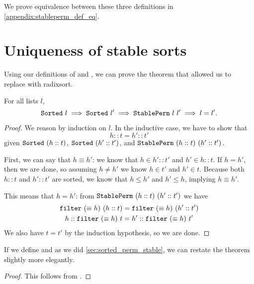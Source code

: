 \documentclass[sigplan,10pt,anonymous,review]{thesis}
\begin{document}
We prove equivalence between these three definitions in
\cref{appendix:stableperm_def_eq}.

\section{Uniqueness of stable sorts}
\label{sec:unique}

Using our definitions of  and , we can
prove the theorem that allowed us to replace  with
radixsort.

\begin{theorem}
  For all lists $l$,
  \begin{equation*}
    \texttt{Sorted}~l \implies \texttt{Sorted}~l' \implies
    \texttt{StablePerm}~l~l' \implies l = l'.
  \end{equation*}
\end{theorem}
\begin{proof}
  We reason by induction on $l$. In the inductive case, we have to
  show that
  \begin{equation*}
    h :: t = h' :: t'
  \end{equation*}
  given $\texttt{Sorted}~(h :: t)$, $\texttt{Sorted}~(h' :: t')$, and
  $\texttt{StablePerm}~(h :: t)~(h' :: t')$.

  First, we can say that $h \equiv h'$: we know that $h \in h' :: t'$ and $h'
  \in h :: t$. If $h = h'$, then we are done, so assuming $h \neq h'$ we
  know $h \in t'$ and $h' \in t$. Because both $h::t$ and $h'::t'$ are
  sorted, we know that $h \le h'$ and $h' \le h$, implying $h \equiv h'$.

  This means that $h = h'$: from $\texttt{StablePerm}~(h :: t)~(h' ::
  t')$ we have
  \begin{align*}
    \texttt{filter}~(\equiv h)~(h :: t) &= \texttt{filter}~(\equiv h)~(h' :: t') \\
    h :: \texttt{filter}~(\equiv h)~t &= h' :: \texttt{filter}~(\equiv h)~t'
  \end{align*}
  We also have $t = t'$ by the induction hypothesis, so we are done.
\end{proof}

If we define  and  as we did
\cref{sec:sorted_perm_stable}, we can restate the theorem slightly
more elegantly.


\stablesortunique
\begin{proof}
  This follows from .
\end{proof}
\end{document}
